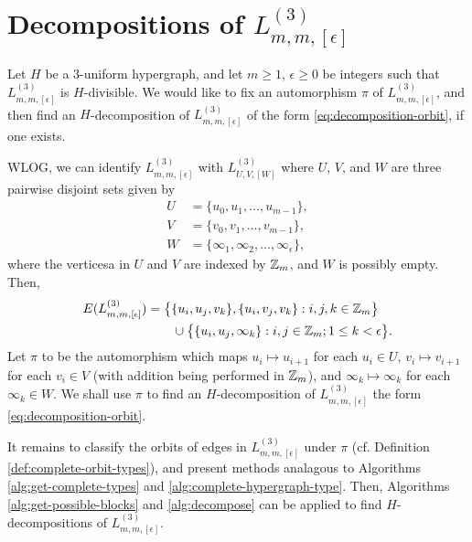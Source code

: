 \section{Decompositions of $L_{m,m,[\epsilon]}^{(3)}$}
\label{sec:methods/candelabra}

Let $H$ be a $3$-uniform hypergraph, and let $m \geq 1$, $\epsilon \geq 0$ be integers such that $L_{m,m,[\epsilon]}^{(3)}$ is $H$-divisible.
We would like to fix an automorphism $\pi$ of $L_{m,m,[\epsilon]}^{(3)}$, and then find an $H$-decomposition of $L_{m,m,[\epsilon]}^{(3)}$ of the form \eqref{eq:decomposition-orbit}, if one exists.

WLOG, we can identify $L_{m,m,[\epsilon]}^{(3)}$ with $L_{U,V,[W]}^{(3)}$ where
$U$, $V$, and $W$ are three pairwise disjoint sets given by
\begin{align}
    U &= \{ u_0, u_1, \ldots, u_{m-1} \}, \nonumber \\
    V &= \{ v_0, v_1, \ldots, v_{m-1} \}, \nonumber \\
    W &= \{ \infty_1, \infty_2, \ldots, \infty_\epsilon \}, \nonumber
\end{align}
where the verticesa in $U$ and $V$ are indexed by $\mathbb{Z}_m$, and $W$ is possibly empty. Then,
\begin{align}
    \label{eq:candelabra-edges}
    E(L_{m,m,[\epsilon]}^{(3)})
    &= \big\{ \{u_i, u_j, v_k\}, \{u_i, v_j, v_k\} : i,j,k \in \mathbb{Z}_m \big\} \\
    & \quad \quad
    \cup \big\{ \{u_i, u_j, \infty_k\} : i,j \in \mathbb{Z}_m; 1 \leq k < \epsilon \big\}.
    \nonumber 
\end{align}
Let $\pi$ to be the automorphism which maps $u_i \mapsto u_{i+1}$ for each $u_i \in U$,
$v_i \mapsto v_{i+1}$ for each $v_i \in V$ (with addition being performed in $\mathbb{Z}_m$), and
$\infty_k \mapsto \infty_k$ for each $\infty_k \in W$.
We shall use $\pi$ to find an $H$-decomposition of $L_{m,m,[\epsilon]}^{(3)}$ the form \eqref{eq:decomposition-orbit}.

It remains to classify the orbits of edges in $L_{m,m,[\epsilon]}^{(3)}$ under $\pi$ (cf. Definition \ref{def:complete-orbit-types}), and present methods analagous to Algorithms \ref{alg:get-complete-types} and \ref{alg:complete-hypergraph-type}.
Then, Algorithms \ref{alg:get-possible-blocks} and \ref{alg:decompose} can be applied to find $H$-decompositions of $L_{m,m,[\epsilon]}^{(3)}$.

